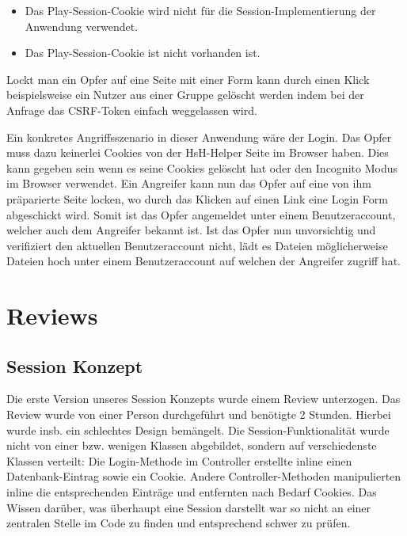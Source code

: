 \documentclass[12pt,DIV14,BCOR10mm,a4paper,twoside,parskip=half-,headsepline,headinclude,english,ngerman,bibliography=totocnumbered]{scrreprt}
\begin{document}
  \begin{itemize}
    \item Das Play-Session-Cookie wird nicht für die Session-Implementierung der Anwendung verwendet.
    \item Das Play-Session-Cookie ist nicht vorhanden ist.
  \end{itemize}

Lockt man ein Opfer auf eine Seite mit einer Form kann durch einen Klick beispielsweise ein Nutzer aus einer Gruppe gelöscht werden indem bei der Anfrage das CSRF-Token einfach weggelassen wird.

Ein konkretes Angriffsszenario in dieser Anwendung wäre der Login. Das Opfer muss dazu keinerlei Cookies von der HsH-Helper Seite im Browser haben. Dies kann gegeben sein wenn es seine Cookies gelöscht hat oder den Incognito Modus im Browser verwendet. Ein Angreifer kann nun das Opfer auf eine von ihm präparierte Seite locken, wo durch das Klicken auf einen Link eine Login Form abgeschickt wird. Somit ist das Opfer angemeldet unter einem Benutzeraccount, welcher auch dem Angreifer bekannt ist. Ist das Opfer nun unvorsichtig und verifiziert den aktuellen Benutzeraccount nicht, lädt es Dateien möglicherweise Dateien hoch unter einem Benutzeraccount auf welchen der Angreifer zugriff hat.


\section{Reviews}
\subsection{Session Konzept}
Die erste Version unseres Session Konzepts wurde einem Review unterzogen. Das Review wurde von einer Person durchgeführt und benötigte 2 Stunden. Hierbei wurde insb. ein schlechtes Design bemängelt. Die Session-Funktionalität wurde nicht von einer bzw. wenigen Klassen abgebildet, sondern auf verschiedenste Klassen verteilt: Die Login-Methode im Controller erstellte inline einen Datenbank-Eintrag sowie ein Cookie. Andere Controller-Methoden manipulierten inline die entsprechenden Einträge und entfernten nach Bedarf Cookies. Das Wissen darüber, was überhaupt eine Session darstellt war so nicht an einer zentralen Stelle im Code zu finden und entsprechend schwer zu prüfen.
\end{document}
